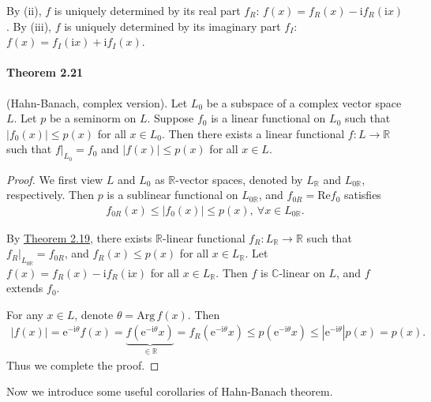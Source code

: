\documentclass{article}
\renewcommand{\Re}{\mathrm{Re}}
\renewcommand{\i}{\mathrm{i}}
\begin{document}
By (ii), $f$ is uniquely determined by its real part $f_R$: $f(x)=f_R(x)-\i f_R(\i x)$. By (iii), $f$ is uniquely determined by its imaginary part $f_I$: $f(x)= f_I(\i x)+\i f_I(x)$.

\paragraph{Theorem 2.21} (Hahn-Banach, complex version). Let $L_0$ be a subspace of a complex vector space $L$. Let $p$ be a seminorm on $L$. Suppose $f_0$ is a linear functional on $L_0$ such that $\vert f_0(x)\vert\leq p(x)$ for all $x\in L_0$. Then there exists a linear functional $f:L\to\mathbb{R}$ such that $f|_{L_0}=f_0$ and $\vert f(x)\vert \leq p(x)$ for all $x\in L$.
\begin{proof}
We first view $L$ and $L_0$ as $\mathbb{R}$-vector spaces, denoted by $L_\mathbb{R}$ and $L_{0\mathbb{R}}$, respectively. Then $p$ is a sublinear functional on $L_{0\mathbb{R}}$, and $f_{0R}=\Re f_0$ satisfies
\begin{align*}
	f_{0R}(x)\leq\vert f_0(x)\vert\leq p(x),\ \forall x\in L_{0\mathbb{R}}.
\end{align*}

By \hyperref[thm:2.19]{Theorem 2.19}, there exists $\mathbb{R}$-linear functional $f_R:L_\mathbb{R}\to\mathbb{R}$ such that $f_R|_{L_{0\mathbb{R}}}=f_{0R}$, and $f_R(x)\leq p(x)$ for all $x\in L_\mathbb{R}$. Let $f(x)=f_R(x)-\i f_R(\i x)$ for all $x\in L_{\mathbb{R}}$. Then $f$ is $\mathbb{C}$-linear on $L$, and $f$ extends $f_0$. 
\vspace{0.1cm}

For any $x\in L$, denote $\theta = \mathrm{Arg}\, f(x)$. Then
\begin{align*}
	\vert f(x)\vert = \mathrm{e}^{-\i\theta}f(x) = \underbrace{f\left(\mathrm{e}^{-\i\theta}x\right)}_{\in\mathbb{R}} = f_R\left(\mathrm{e}^{-\i\theta}x\right)\leq p\left(\mathrm{e}^{-\i\theta}x\right) \leq\left\vert\mathrm{e}^{-\i\theta}\right\vert p(x) = p(x).
\end{align*}
Thus we complete the proof.
\end{proof}

Now we introduce some useful corollaries of Hahn-Banach theorem.
\end{document}
